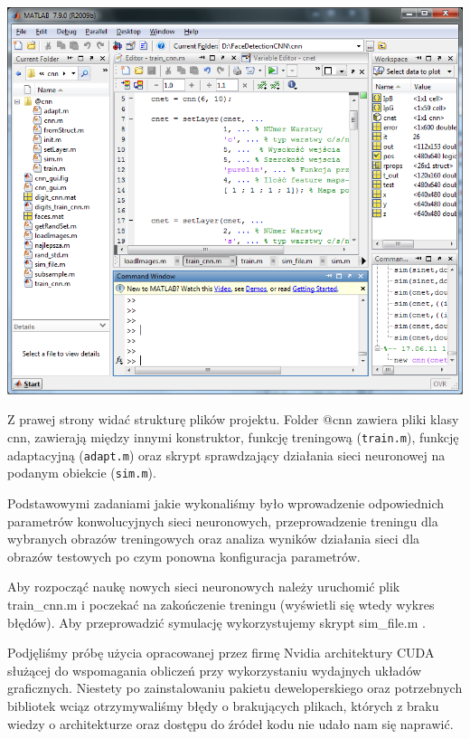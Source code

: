 \documentclass[11pt,a4paper]{article}
\begin{document}
\vspace*{0.5cm}
\begin{center}
\includegraphics[scale=0.5]{matlab}
\end{center}
\vspace*{0.5cm}

Z prawej strony widać strukturę plików projektu. Folder @cnn zawiera pliki klasy cnn, zawierają 
między innymi konstruktor, funkcję treningową (\verb#train.m#), funkcję adaptacyjną 
(\verb#adapt.m#) oraz skrypt sprawdzający działania sieci neuronowej na podanym obiekcie 
(\verb#sim.m#).

Podstawowymi zadaniami jakie wykonaliśmy było wprowadzenie odpowiednich parametrów konwolucyjnych 
sieci neuronowych, przeprowadzenie treningu dla wybranych obrazów treningowych oraz analiza wyników 
działania sieci dla obrazów testowych po czym ponowna konfiguracja parametrów.

Aby rozpocząć naukę nowych sieci neuronowych należy uruchomić plik train\_cnn.m i poczekać na 
zakończenie treningu (wyświetli się wtedy wykres błędów). Aby przeprowadzić symulację 
wykorzystujemy skrypt sim\_file.m .

Podjęliśmy próbę użycia opracowanej przez firmę Nvidia architektury CUDA służącej do wspomagania 
obliczeń przy wykorzystaniu wydajnych układów graficznych. Niestety po zainstalowaniu pakietu 
deweloperskiego oraz potrzebnych bibliotek wciąz otrzymywaliśmy błędy o brakujących plikach, 
których z braku wiedzy o architekturze oraz dostępu do źródeł kodu nie udało nam się naprawić.
  
\end{document}
